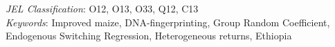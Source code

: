 \documentclass[11pt]{article}
\begin{document}
\begin{titlepage}
\begin{center}
\begin{abstract}
        \end{abstract}\end{center}
        
        {\small \noindent\emph{JEL Classification}: O12, O13, O33, Q12, C13 \\
        	\emph{Keywords}: Improved maize, DNA-fingerprinting, Group Random Coefficient, Endogenous Switching Regression, Heterogeneous returns, Ethiopia}

    \end{titlepage}
\maketitle
\newpage


\end{document}
